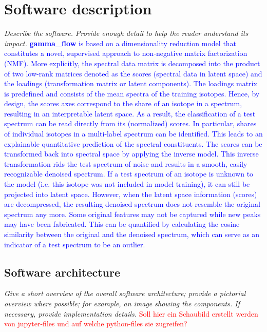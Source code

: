 \documentclass[preprint,12pt, a4paper]{elsarticle}
\begin{document}
\section{Software description}

\textit{Describe the software. Provide enough detail to help the reader understand its impact. }
\textcolor{blue}{
\textbf{gamma\_flow} is based on a dimensionality reduction model that constitutes a novel, supervised approach to non-negative matrix factorization (NMF). More explicitly, the spectral data matrix is decomposed into the product of two low-rank matrices denoted as the scores (spectral data in latent space) and the loadings (transformation matrix or latent components). The loadings matrix is predefined and consists of the mean spectra of the training isotopes. Hence, by design, the scores axes correspond to the share of an isotope in a spectrum, resulting in an interpretable latent space. 
As a result, the classification of a test spectrum can be read directly from its (normalized) 
scores. In particular, shares of individual isotopes in a multi-label spectrum can be 
identified. This leads to an explainable quantitative prediction of the spectral constituents. 
The scores can be transformed back into spectral space by applying the inverse model. This 
inverse transformation rids the test spectrum of noise and results in a smooth, easily 
recognizable denoised spectrum. 
If a test spectrum of an isotope is unknown to the model (i.e. this isotope was not included in 
model training), it can still be projected into latent space. However, when the latent space 
information (scores) are decompressed, the resulting denoised spectrum does not resemble the 
original spectrum any more. Some original features may not be captured while new peaks may have 
been fabricated. This can be quantified by calculating the cosine similarity between the original and the denoised spectrum, which can serve as an indicator of a test spectrum 
to be an outlier.}

\subsection{Software architecture}
\textit{  Give a short overview of the overall software architecture; provide a pictorial overview where possible; for example, an image showing the components. If necessary, provide implementation details.}
\textcolor{red}{Soll hier ein Schaubild erstellt werden von jupyter-files und auf welche python-files sie zugreifen?}
\end{document}
